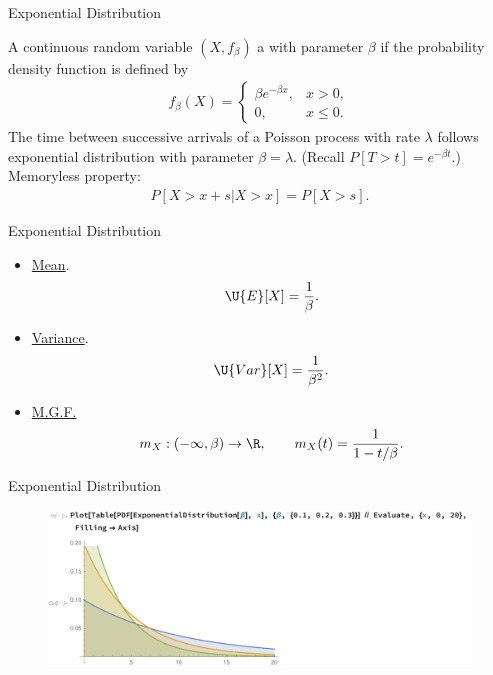 \begin{frame}{Exponential Distribution}

\justifying
{} A continuous random variable $(X, f_{\beta})$ a  with parameter $\beta$ if the probability density function is defined by
\begin{align*}
f_{\beta}(X) = \left\{
\begin{array}{ll}
\beta e^{-\beta x}, & x > 0, \\
0, & x\leq 0.
\end{array}
\right.
\end{align*}
 The time between successive arrivals of a Poisson process with rate $\lambda$ follows exponential distribution with parameter $\beta = \lambda$. (Recall $P[T > t] = e^{-\beta t}$.)\\
 Memoryless property:
\begin{align*}
P[X > x + s|X > x] = P[X > s].
\end{align*}


\end{frame}

\begin{frame}{Exponential Distribution}

\justifying
{} 
\begin{itemize}
	\justifying
	\item \underline{Mean}. 
	\begin{align*}
	\U{E}[X] = \frac{1}{\beta}.
	\end{align*}
	\item \underline{Variance}.
	\begin{align*}
	\U{Var}[X] = \frac{1}{\beta^2}.
	\end{align*}
	\item \underline{M.G.F.}
	\begin{align*}
	m_X: (-\infty, \beta) \rightarrow \R, \qquad m_X(t) = \frac{1}{1-t/\beta}.
	\end{align*}
\end{itemize}

\end{frame}

\begin{frame}{Exponential Distribution}

\begin{figure}[htbp]
	\centering
	\includegraphics[width=\linewidth]{./images/rc2fig2.pdf}
\end{figure}

\end{frame}



